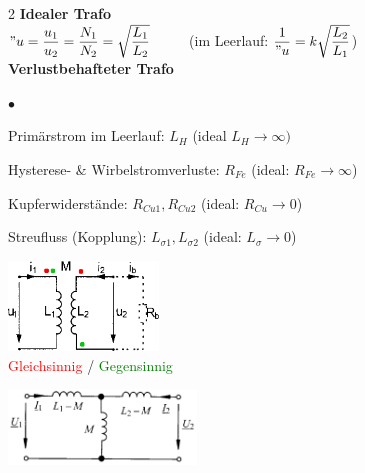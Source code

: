 \begin{multicols}{2}
	  	\textbf{Idealer Trafo}\\ 
	  	$"u = \dfrac{u_1}{u_2} = \dfrac{N_1}{N_2} = \sqrt{\dfrac{L_1}{L_2}}$ $\qquad$ (im Leerlauf:
	  	$\dfrac{1}{"u} = k \sqrt{\dfrac{L_2}{L_1}}$)\\

  		\textbf{Verlustbehafteter Trafo}
  		\begin{list}{$\bullet$}{\setlength{\itemsep}{0cm} \setlength{\parsep}{0cm} \setlength{\topsep}{0cm}} 
          \item Prim\"arstrom im Leerlauf: $L_H$
          	(ideal $L_H \rightarrow \infty)$
          \item Hysterese- \& Wirbelstromverluste: $R_{Fe}$ \newline
          	(ideal: $R_{Fe}\rightarrow \infty$) 
          \item Kupferwiderst\"ande: $R_{Cu1}, R_{Cu2}$
          	(ideal: $R_{Cu}
          \rightarrow 0$)
          \item Streufluss (Kopplung): $L_{\sigma1}, L_{\sigma2}$
          	(ideal: $L_{\sigma} \rightarrow 0$)
        \end{list}

	\columnbreak
  		\begin{flushleft}
  		\includegraphics[width=4cm]{bilder/trafo-kopplung.png} \\
  		\small{\textcolor{red}{Gleichsinnig} / \textcolor{green}{Gegensinnig}} \\
  		\vspace{1cm}

	  	\includegraphics[width=5cm]{bilder/T_Ersatzschaltbild_VST.png}\\
		\end{flushleft}  	
	
\end{multicols}
\renewcommand{\arraystretch}{1}